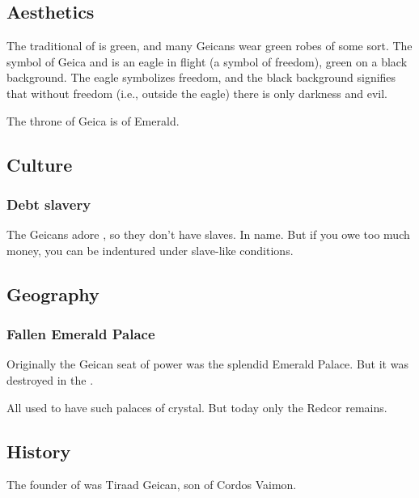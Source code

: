 \subsection{Aesthetics}
The traditional \colour of \ClanGeican is green, and many Geicans wear green robes of some sort. 
The symbol of Geica and \ClanGeican is an eagle in flight (a symbol of freedom), green on a black background. 
The eagle symbolizes freedom, and the black background signifies that without freedom (i.e., outside the eagle) there is only darkness and evil. 

The throne of Geica is of Emerald. 









\subsection{Culture}





\subsubsection{Debt slavery}
The Geicans adore , so they don't have slaves. 
In name. 
But if you owe too much money, you can be indentured under slave-like conditions. 









\subsection{Geography}
\subsubsection{Fallen Emerald Palace}
Originally the Geican seat of power was the splendid Emerald Palace. 
But it was destroyed in the \darkfall. 

All \VaimonClans used to have such palaces of crystal. 
But today only the Redcor  remains. 








\subsection{History}
The founder of \ClanGeican was Tiraad Geican, son of Cordos Vaimon. 









